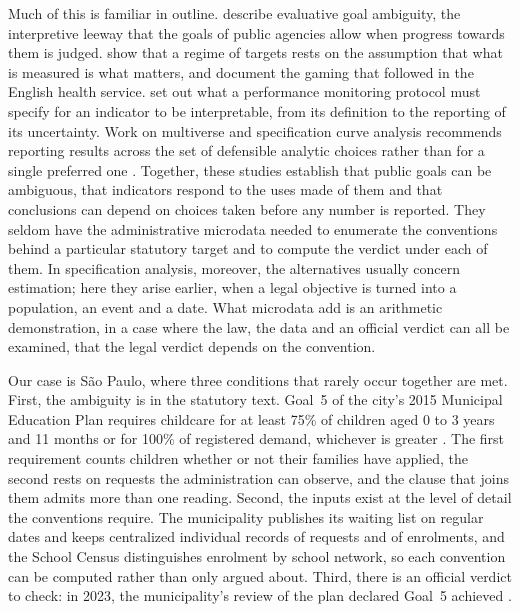 Much of this is familiar in outline. \citet{chun2005goal} describe evaluative goal ambiguity, the interpretive leeway that the goals of public agencies allow when progress towards them is judged. \citet{bevan2006measured} show that a regime of targets rests on the assumption that what is measured is what matters, and document the gaming that followed in the English health service. \citet{bird2005performance} set out what a performance monitoring protocol must specify for an indicator to be interpretable, from its definition to the reporting of its uncertainty. Work on multiverse and specification curve analysis recommends reporting results across the set of defensible analytic choices rather than for a single preferred one \citep{steegen2016increasing,simonsohn2020specification}. Together, these studies establish that public goals can be ambiguous, that indicators respond to the uses made of them and that conclusions can depend on choices taken before any number is reported. They seldom have the administrative microdata needed to enumerate the conventions behind a particular statutory target and to compute the verdict under each of them. In specification analysis, moreover, the alternatives usually concern estimation; here they arise earlier, when a legal objective is turned into a population, an event and a date. What microdata add is an arithmetic demonstration, in a case where the law, the data and an official verdict can all be examined, that the legal verdict depends on the convention.

Our case is S\~ao Paulo, where three conditions that rarely occur together are met. First, the ambiguity is in the statutory text. Goal~5 of the city's 2015 Municipal Education Plan requires childcare for at least 75\% of children aged 0 to 3 years and 11 months or for 100\% of registered demand, whichever is greater \citep{saopaulo2015pme}. The first requirement counts children whether or not their families have applied, the second rests on requests the administration can observe, and the clause that joins them admits more than one reading. Second, the inputs exist at the level of detail the conventions require. The municipality publishes its waiting list on regular dates and keeps centralized individual records of requests and of enrolments, and the School Census distinguishes enrolment by school network, so each convention can be computed rather than only argued about. Third, there is an official verdict to check: in 2023, the municipality's review of the plan declared Goal~5 achieved \citep{saopaulo2023conferencia}.

